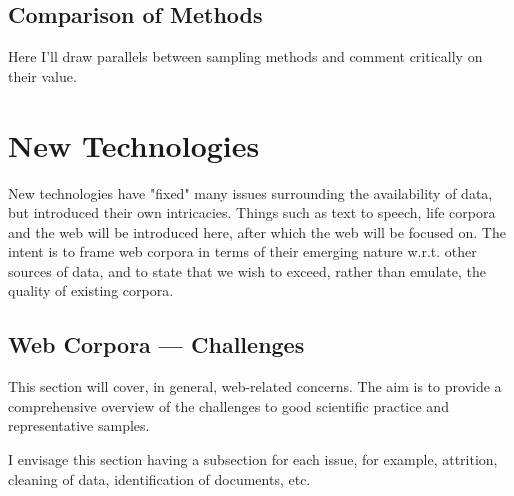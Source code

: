 \subsection{Comparison of Methods}
Here I'll draw parallels between sampling methods and comment critically on their value.



\section{New Technologies} %
New technologies have "fixed" many issues surrounding the availability of data, but introduced their own intricacies.  Things such as text to speech, life corpora and the web will be introduced here, after which the web will be focused on.  The intent is to frame web corpora in terms of their emerging nature w.r.t. other sources of data, and to state that we wish to exceed, rather than emulate, the quality of existing corpora.


\subsection{Web Corpora --- Challenges}
This section will cover, in general, web-related concerns.  The aim is to provide a comprehensive overview of the challenges to good scientific practice and representative samples.

I envisage this section having a subsection for each issue, for example, attrition, cleaning of data, identification of documents, etc.

